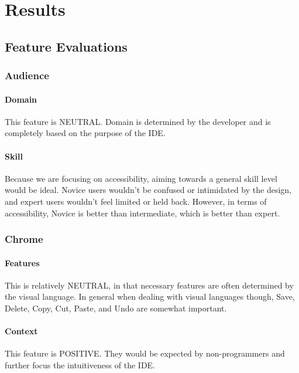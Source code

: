 \section{Results}
\label{sec:results}



\subsection{Feature Evaluations}
\label{sec:feature_evaluations}

\subsubsection{Audience}

\paragraph{Domain} This feature is NEUTRAL. Domain is determined by the
developer and is completely based on the purpose of the IDE.

\paragraph{Skill} Because we are focusing on accessibility, aiming towards
a general skill level would be ideal. Novice users wouldn't be confused or
intimidated by the design, and expert users wouldn't feel limited or held
back. However, in terms of accessibility, Novice is better than
intermediate, which is better than expert.


\subsubsection{Chrome}

\paragraph{Features} This is relatively NEUTRAL, in that necessary features
are often determined by the visual language. In general when dealing with
visual languages though, Save, Delete, Copy, Cut, Paste, and Undo are
somewhat important.

\paragraph{Context} This feature is POSITIVE. They would be expected by
non-programmers and further focus the intuitiveness of the IDE.

